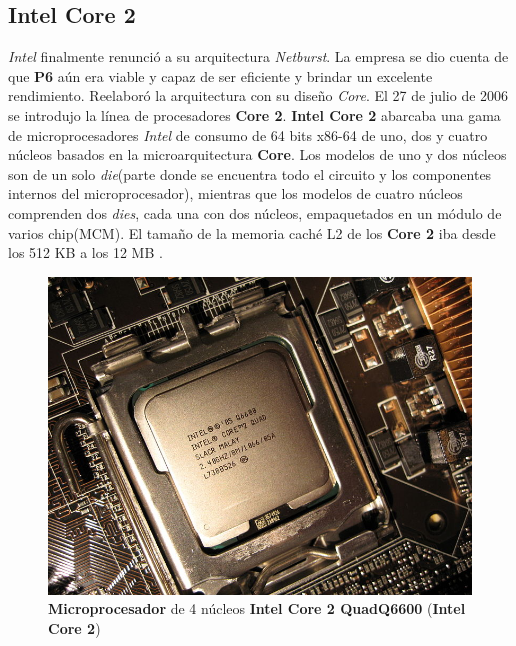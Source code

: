 \subsection{Intel Core 2}
\emph{Intel} finalmente renunció a su arquitectura \emph{Netburst}. La empresa se dio cuenta de que \textbf{P6} aún era viable y capaz de ser eficiente y brindar 
un excelente rendimiento. Reelaboró la arquitectura con su diseño \emph{Core}. El 27 de julio de 2006 se introdujo la línea de procesadores \textbf{Core 2}.
\textbf{Intel Core 2} abarcaba una gama de microprocesadores \emph{Intel} de consumo de 64 bits x86-64 de uno, dos y cuatro 
núcleos basados en la microarquitectura \textbf{Core}. Los modelos de uno y dos núcleos son de un solo \emph{die}(parte donde se encuentra 
todo el circuito y los componentes internos del microprocesador), mientras que los modelos de cuatro núcleos comprenden dos \emph{dies}, cada una con dos núcleos, 
empaquetados en un módulo de varios chip(MCM). El tamaño de la memoria caché  L2 de los \textbf{Core 2} iba desde los 512 KB a los 
12 MB .

\begin{figure}[htb]
	\centering
	\includegraphics[scale = 0.8]{Graphics/IntelCore_2_Q6600.jpeg}
	\caption{\textbf{Microprocesador} de 4 núcleos  \textbf{ Intel Core 2 QuadQ6600} (\textbf{Intel Core 2})}
	\label{fig:24}
\end{figure}
\newpage

